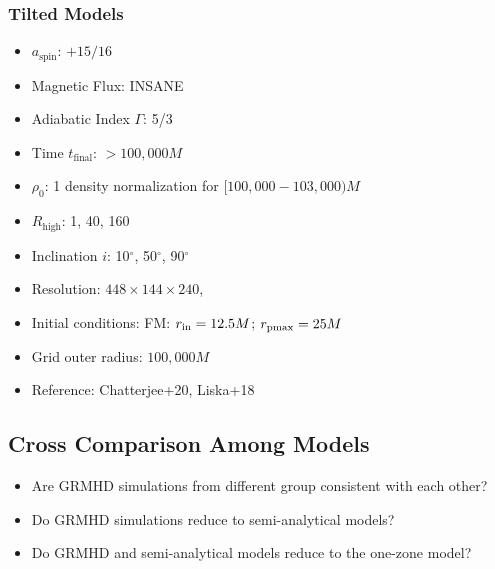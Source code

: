 \subsubsection{Tilted Models}

\begin{itemize}[noitemsep]
\item $a_\mathrm{spin}$: $+15/16$
\item Magnetic Flux: INSANE
\item Adiabatic Index $\Gamma$: 5/3
\item Time $t_\mathrm{final}$: $>100,000M$
\item $\rho_0$: 1 density normalization for $[100,000-103,000)M$
\item $R_\mathrm{high}$: 1, 40, 160
\item Inclination $i$: 10$^\circ$, 50$^\circ$, 90$^\circ$
\item Resolution: $448\times 144\times 240$,
\item Initial conditions: FM: $r_{\rm in}=12.5M$; $r_{\rm pmax}=25M$
\item Grid outer radius: $100,000M$
\item Reference: Chatterjee+20, Liska+18
\end{itemize}

\subsection{Cross Comparison Among Models}

\begin{itemize}
\item Are GRMHD simulations from different group consistent with each other?
\item Do GRMHD simulations reduce to semi-analytical models?
\item Do GRMHD and semi-analytical models reduce to the one-zone model?
\end{itemize}
